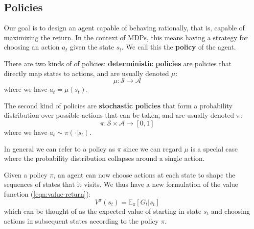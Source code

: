 \documentclass[journal, onecolumn, 12pt, draftclsnofoot]{IEEEtran}
\newcommand{\kword}[1]{\textbf{#1}}
\newcommand{\mc}[1]{\mathcal{#1}}
\begin{document}
		\subsection{Policies}
		\par Our goal is to design an agent capable of behaving rationally, that is, capable of maximizing the return. In the context of MDPs, this means having a strategy for choosing an action $a_t$ given the state $s_t$. We call this the \kword{policy} of the agent.
		\par There are two kinds of of policies: \kword{deterministic policies} are policies that directly map states to actions, and are usually denoted $\mu$:
		\begin{equation}
			\label{eqn:mu-deterministic-policy}
			\mu: \mc{S} \to \mc{A}
		\end{equation}
		where we have $a_t = \mu(s_t)$.
		\par The second kind of policies are \kword{stochastic policies} that form a probability distribution over possible actions that can be taken, and are usually denoted $\pi$:
		\begin{equation}
			\label{eqn:pi-nondeterministic-policy}
			\pi: \mc{S} \times \mc{A} \to [0,1]
		\end{equation}
		where we have $a_t \sim \pi ( \cdot \big\vert s_t)$.
		\par In general we can refer to a policy as $\pi$ since we can regard $\mu$ is a special case where the probability distribution collapses around a single action.

		Given a policy $\pi$, an agent can now choose actions at each state to shape the sequences of states that it visits. We thus have a new formulation of the value function (\ref{eqn:value-return}):
		\begin{equation}
			\label{eqn:value-return}
			V^\pi(s_t) = \mathbb{E}_\pi \left[ G_t \big\vert s_t \right]
		\end{equation}
		which can be thought of as the expected value of starting in state $s_t$ and choosing actions in subsequent states according to the policy $\pi$.
\end{document}
